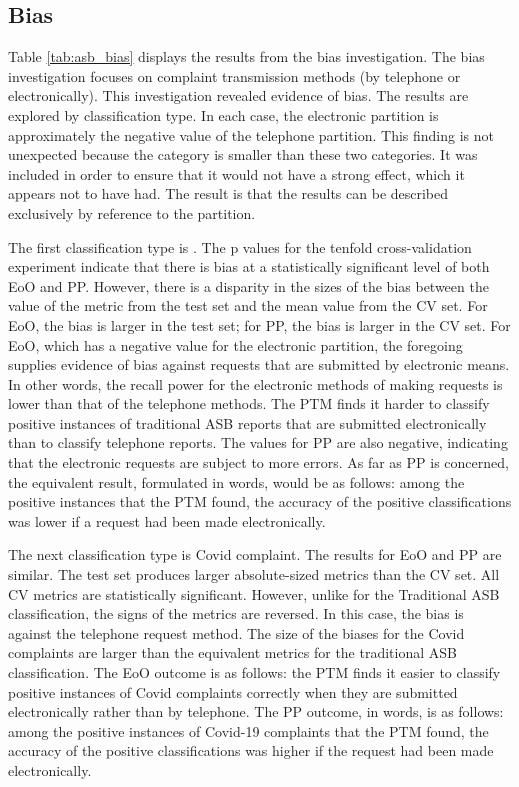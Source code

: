\subsection{Bias} 

Table \ref{tab:asb_bias} displays the results from the bias investigation. The bias investigation focuses on complaint transmission methods (by telephone or electronically). This investigation revealed evidence of bias. The results are explored by classification type. In each case, the electronic partition is approximately the negative value of the telephone partition. This finding is not unexpected because the  category is smaller than these two categories. It was included in order to ensure that it would not have a strong effect, which it appears not to have had. The result is that the results can be described exclusively by reference to the  partition.

The first classification type is . The p values for the tenfold cross-validation experiment indicate that there is bias at a statistically significant level of both EoO and PP. However, there is a disparity in the sizes of the bias between the value of the metric from the test set and the mean value from the CV set. For EoO, the bias is larger in the test set; for PP, the bias is larger in the CV set. For EoO, which has a negative value for the electronic partition, the foregoing supplies evidence of bias against requests that are submitted by electronic means. In other words, the recall power for the electronic methods of making requests is lower than that of the telephone methods. The PTM finds it harder to classify positive instances of traditional ASB reports that are submitted electronically than to classify telephone reports. The values for PP are also negative, indicating that the electronic requests are subject to more errors. As far as PP is concerned, the equivalent result, formulated in words, would be as follows: among the positive instances that the PTM found, the accuracy of the positive classifications was lower if a request had been made electronically.

The next classification type is Covid complaint. The results for EoO and PP are similar. The test set produces larger absolute-sized metrics than the CV set. All CV metrics are statistically significant. However, unlike for the Traditional ASB classification, the signs of the metrics are reversed. In this case, the bias is against the telephone request method. The size of the biases for the Covid complaints are larger than the equivalent metrics for the traditional ASB classification. The EoO outcome is as follows: the PTM finds it easier to classify positive instances of Covid complaints correctly when they are submitted electronically rather than by telephone. The PP outcome, in words, is as follows: among the positive instances of Covid-19 complaints that the PTM found, the accuracy of the positive classifications was higher if the request had been made electronically.

